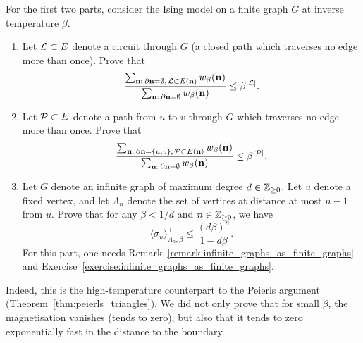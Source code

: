\begin{exercise}
    For the first two parts, consider
    the Ising model on a finite graph $G$ at inverse temperature $\beta$.
    \begin{enumerate}
        \item Let $\mathcal L\subset E$ denote a circuit through $G$
        (a closed path which traverses no edge more than once).
        Prove that
        \[
            \frac{
                \sum_{\mathbf{n}:\:\partial\mathbf{n}=\emptyset,\,\mathcal L\subset E(\mathbf{n})} w_\beta(\mathbf{n})
            }{
                \sum_{\mathbf{n}:\:\partial\mathbf{n}=\emptyset} w_\beta(\mathbf{n})
            }
            \leq
            \beta^{|\mathcal L|}.
        \]
        \item Let $\mathcal P\subset E$ denote a path from $u$ to $v$ through $G$
        which traverses no edge more than once.
        Prove that
        \[
            \frac{
                \sum_{\mathbf{n}:\:\partial\mathbf{n}=\{u,v\},\,\mathcal P\subset E(\mathbf{n})} w_\beta(\mathbf{n})
            }{
                \sum_{\mathbf{n}:\:\partial\mathbf{n}=\emptyset} w_\beta(\mathbf{n})
            }
            \leq
            \beta^{|\mathcal P|}.
        \]
        \item Let $G$ denote an infinite graph of maximum degree $d\in\mathbb Z_{\geq 0}$.
        Let $u$ denote a fixed vertex, and let $\Lambda_n$ denote the set of vertices
        at distance at most $n-1$ from $u$.
        Prove that for any $\beta<1/d$ and $n\in\mathbb Z_{\geq 0}$, we have
        \[
            \langle\sigma_u\rangle_{\Lambda_n,\beta}^+
            \leq
            \frac{(d\beta)^n}{1-d\beta}.
        \]
        For this part, one needs Remark~\ref{remark:infinite_graphs_as_finite_graphs}
        and Exercise~\ref{exercise:infinite_graphs_as_finite_graphs}.
    \end{enumerate}
    Indeed, this is the high-temperature counterpart to the Peierls argument
    (Theorem~\ref{thm:peierls_triangles}).
    We did not only prove that for small $\beta$, the magnetisation vanishes
    (tends to zero),
    but also that it tends to zero exponentially fast in the distance to the boundary.
\end{exercise}
